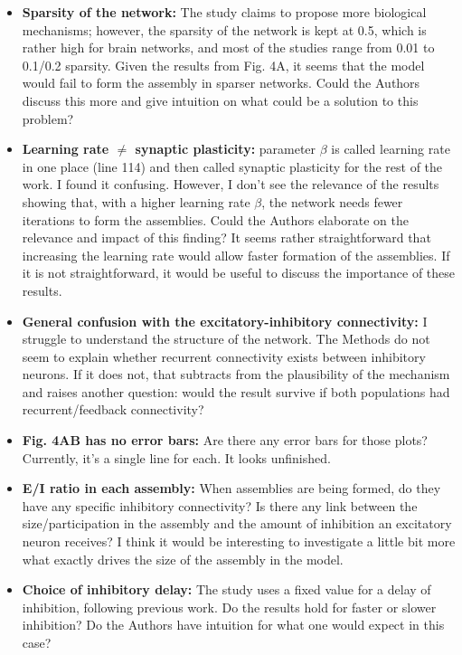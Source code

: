 \documentclass[a4paper, 11pt]{article}
\begin{document}
\begin{itemize}
    \item \textbf{Sparsity of the network:} The study claims to propose more biological mechanisms; however, the sparsity of the network is kept at 0.5, which is rather high for brain networks, and most of the studies range from 0.01 to 0.1/0.2 sparsity. Given the results from Fig. 4A, it seems that the model would fail to form the assembly in sparser networks. Could the Authors discuss this more and give intuition on what could be a solution to this problem?
    
    \item \textbf{Learning rate $\neq$ synaptic plasticity:} parameter $\beta$ is called learning rate in one place (line 114) and then called synaptic plasticity for the rest of the work. I found it confusing. However, I don't see the relevance of the results showing that, with a higher learning rate $\beta$, the network needs fewer iterations to form the assemblies. Could the Authors elaborate on the relevance and impact of this finding? It seems rather straightforward that increasing the learning rate would allow faster formation of the assemblies. If it is not straightforward, it would be useful to discuss the importance of these results.
    
    \item \textbf{General confusion with the excitatory-inhibitory connectivity:} I struggle to understand the structure of the network. The Methods do not seem to explain whether recurrent connectivity exists between inhibitory neurons. If it does not, that subtracts from the plausibility of the mechanism and raises another question: would the result survive if both populations had recurrent/feedback connectivity?
    
    \item \textbf{Fig. 4AB has no error bars:} Are there any error bars for those plots? Currently, it's a single line for each. It looks unfinished.
    
    \item \textbf{E/I ratio in each assembly:} When assemblies are being formed, do they have any specific inhibitory connectivity? Is there any link between the size/participation in the assembly and the amount of inhibition an excitatory neuron receives? I think it would be interesting to investigate a little bit more what exactly drives the size of the assembly in the model.
    
    \item \textbf{Choice of inhibitory delay:} The study uses a fixed value for a delay of inhibition, following previous work. Do the results hold for faster or slower inhibition? Do the Authors have intuition for what one would expect in this case?
\end{itemize}
\end{document}

